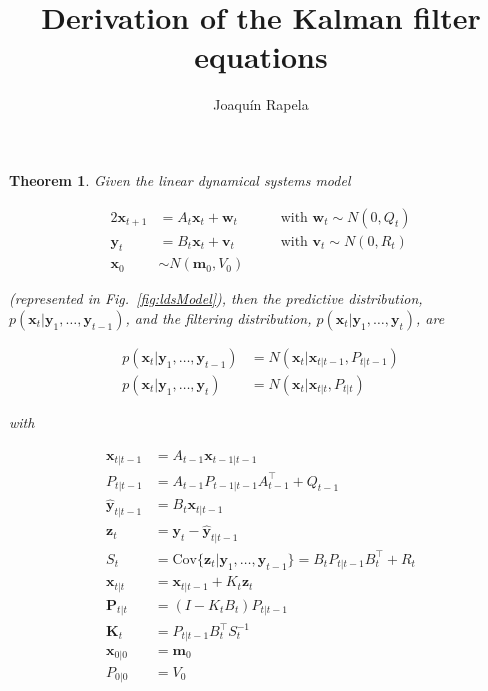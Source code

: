 \documentclass[12pt]{article}
\title{Derivation of the Kalman filter equations}
\author{Joaquín Rapela}
\newtheorem{theorem}{Theorem}
\begin{document}
\maketitle

\begin{theorem}

    Given the linear dynamical systems model

    \begin{alignat*}{2}
        \mathbf{x}_{t+1}&=A_t\mathbf{x}_t+\mathbf{w}_t&\quad&\text{with }\mathbf{w}_t\sim N(0,Q_t)\\
        \mathbf{y}_t&=B_t\mathbf{x}_t+\mathbf{v}_t&&\text{with }\mathbf{v}_t\sim N(0,R_t)\\
        \mathbf{x}_0&\sim N(\mathbf{m}_0,V_0)&&
    \end{alignat*}

    \noindent (represented in Fig.~\ref{fig:ldsModel}), then the predictive
    distribution, $p(\mathbf{x}_t|\mathbf{y}_1,\ldots,\mathbf{y}_{t-1})$, and
    the filtering distribution,
    $p(\mathbf{x}_t|\mathbf{y}_1,\ldots,\mathbf{y}_t)$, are

    \begin{align*}
        p(\mathbf{x}_t|\mathbf{y}_1,\ldots,\mathbf{y}_{t-1})&=N(\mathbf{x}_t|\mathbf{x}_{t|t-1},P_{t|t-1})\\
        p(\mathbf{x}_t|\mathbf{y}_1,\ldots,\mathbf{y}_t)&=N(\mathbf{x}_t|\mathbf{x}_{t|t},P_{t|t})
    \end{align*}

    \noindent with

    \begin{align*}
        \mathbf{x}_{t|t-1}&=A_{t-1}\mathbf{x}_{t-1|t-1}\\
        P_{t|t-1}&=A_{t-1}P_{t-1|t-1}A_{t-1}^\intercal+Q_{t-1}\\
        \hat{\mathbf{y}}_{t|t-1}&=B_t\mathbf{x}_{t|t-1}\\
        \mathbf{z}_t&=\mathbf{y}_t-\hat{\mathbf{y}}_{t|t-1}\\
        S_t&=\text{Cov}\{\mathbf{z}_t|\mathbf{y}_1,\ldots,\mathbf{y}_{t-1}\}=B_tP_{t|t-1}B_t^\intercal+R_t\\
        \mathbf{x}_{t|t}&=\mathbf{x}_{t|t-1}+K_t\mathbf{z}_t\\
        \mathbf{P}_{t|t}&=(I-K_tB_t)P_{t|t-1}\\
        \mathbf{K}_t&=P_{t|t-1}B_t^\intercal S_t^{-1}\\
        \mathbf{x}_{0|0}&=\mathbf{m}_0\\
        P_{0|0}&=V_0
    \end{align*}
    \label{thm:kalmanFilterEqs}
\end{theorem}
\end{document}
